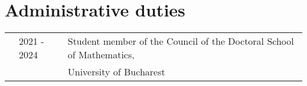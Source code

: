 \documentclass[letterpaper,11pt,oneside]{article}
\begin{document}
\noindent
\section{Administrative duties}
\normalsize
\begin{tabular}{@{} l l l}
    & 2021 - 2024 & Student member of the Council of the Doctoral School of Mathematics, \\ 
    &                & University of Bucharest
\end{tabular}
\mbox{}\\[10mm]







\end{document}
